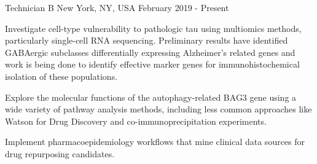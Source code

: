 %
%
%

\vspace*{0.35cm}

\begin{cventries}

    {Technician B}
    {New York, NY, USA}
    {February 2019 - Present}
    {\begin{cvitems}
        \item{Investigate cell-type vulnerability to pathologic tau using multiomics
            methods, particularly single-cell RNA sequencing. Preliminary results have
            identified GABAergic subclasses differentially expressing Alzheimer's
            related genes and work is being done to identify effective marker genes
            for immunohistochemical isolation of these populations.\vspace*{0.1cm}}
        \item{Explore the molecular functions of the autophagy-related BAG3 gene using
            a wide variety of pathway analysis methods, including less common approaches
            like Watson for Drug Discovery and co-immunoprecipitation experiments.
            \vspace*{0.1cm}}
        \item{Implement pharmacoepidemiology workflows that mine clinical data sources
            for drug repurposing candidates.}
    \end{cvitems}}
    \vspace*{0.2cm}


\end{cventries}
